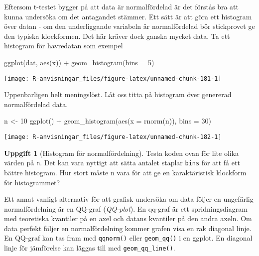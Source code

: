 \documentclass[
]{book}
\newenvironment{Shaded}{\begin{snugshade}}{\end{snugshade}}
\newcommand{\AttributeTok}[1]{\textcolor[rgb]{0.77,0.63,0.00}{#1}}
\newcommand{\DecValTok}[1]{\textcolor[rgb]{0.00,0.00,0.81}{#1}}
\newcommand{\FunctionTok}[1]{\textcolor[rgb]{0.00,0.00,0.00}{#1}}
\newcommand{\NormalTok}[1]{#1}
\newcommand{\OtherTok}[1]{\textcolor[rgb]{0.56,0.35,0.01}{#1}}
\newcommand{\SpecialCharTok}[1]{\textcolor[rgb]{0.00,0.00,0.00}{#1}}
\theoremstyle{definition}
\theoremstyle{definition}
\theoremstyle{definition}
\newtheorem{exercise}{Uppgift}[chapter]
\theoremstyle{definition}
\theoremstyle{remark}
\begin{document}
Eftersom t-testet bygger på att data är normalfördelad är det förstås bra att kunna undersöka om det antagandet stämmer. Ett sätt är att göra ett histogram över datan - om den underliggande variabeln är normalfördelad bör stickprovet ge den typiska klockformen. Det här kräver dock ganska mycket data. Ta ett histogram för havredatan som exempel

\begin{Shaded}
\begin{Highlighting}[]
\FunctionTok{ggplot}\NormalTok{(dat, }\FunctionTok{aes}\NormalTok{(x)) }\SpecialCharTok{+} \FunctionTok{geom\_histogram}\NormalTok{(}\AttributeTok{bins =} \DecValTok{5}\NormalTok{)}
\end{Highlighting}
\end{Shaded}

\begin{center}\texttt{[image: R-anvisningar\_files/figure-latex/unnamed-chunk-181-1]} \end{center}

Uppenbarligen helt meningslöst. Låt oss titta på histogram över genererad normalfördelad data.

\begin{Shaded}
\begin{Highlighting}[]
\NormalTok{n }\OtherTok{\textless{}{-}} \DecValTok{10}
\FunctionTok{ggplot}\NormalTok{() }\SpecialCharTok{+} \FunctionTok{geom\_histogram}\NormalTok{(}\FunctionTok{aes}\NormalTok{(}\AttributeTok{x =} \FunctionTok{rnorm}\NormalTok{(n)), }\AttributeTok{bins =} \DecValTok{30}\NormalTok{)}
\end{Highlighting}
\end{Shaded}

\begin{center}\texttt{[image: R-anvisningar\_files/figure-latex/unnamed-chunk-182-1]} \end{center}

\begin{exercise}[Histogram för normalfördelning]
Testa koden ovan för lite olika värden på \texttt{n}. Det kan vara nyttigt att sätta antalet staplar \texttt{bins} för att få ett bättre histogram. Hur stort måste n vara för att ge en karaktäristisk klockform för histogrammet?
\end{exercise}

Ett annat vanligt alternativ för att grafisk undersöka om data följer en ungefärlig normalfördelning är en QQ-graf (\emph{QQ-plot}). En qq-graf är ett spridningsdiagram med teoretiska kvantiler på en axel och datans kvantiler på den andra axeln. Om data perfekt följer en normalfördelning kommer grafen visa en rak diagonal linje. En QQ-graf kan tas fram med \texttt{qqnorm()} eller \texttt{geom\_qq()} i en ggplot. En diagonal linje för jämförelse kan läggas till med \texttt{geom\_qq\_line()}.
\end{document}
